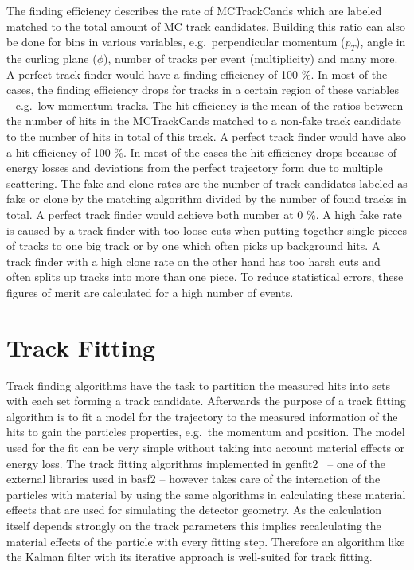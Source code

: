 The finding efficiency describes the rate of MCTrackCands which are labeled matched to the total amount of MC track candidates. Building this ratio can also be done for bins in various variables, e.g.\ perpendicular momentum ($p_T$), angle in the curling plane ($\phi$), number of tracks per event (multiplicity) and many more. A perfect track finder would have a finding efficiency of 100 \%. In most of the cases, the finding efficiency drops for tracks in a certain region of these variables -- e.g.\ low momentum tracks.
The hit efficiency is the mean of the ratios between the number of hits in the MCTrackCands matched to a non-fake track candidate to the number of hits in total of this track. A perfect track finder would have also a hit efficiency of 100 \%. In most of the cases the hit efficiency drops because of energy losses and deviations from the perfect trajectory form due to multiple scattering.
The fake and clone rates are the number of track candidates labeled as fake or clone by the matching algorithm divided by the number of found tracks in total. A perfect track finder would achieve both number at 0 \%. A high fake rate is caused by a track finder with too loose cuts when putting together single pieces of tracks to one big track or by one which often picks up background hits. A track finder with a high clone rate on the other hand has too harsh cuts and often splits up tracks into more than one piece. To reduce statistical errors, these figures of merit are calculated for a high number of events.

\section{Track Fitting} \label{section-fitting}

Track finding algorithms have the task to partition the measured hits into sets with each set forming a track candidate. Afterwards the purpose of a track fitting algorithm is to fit a model for the trajectory to the measured information of the hits to gain the particles properties, e.g.\ the momentum and position. The model used for the fit can be very simple without taking into account material effects or energy loss. The track fitting algorithms implemented in genfit2~\cite{genfit} -- one of the external libraries used in basf2 -- however takes care of the interaction of the particles with material by using the same algorithms in calculating these material effects that are used for simulating the detector geometry. As the calculation itself depends strongly on the track parameters this implies recalculating the material effects of the particle with every fitting step. Therefore an algorithm like the Kalman filter with its iterative approach is well-suited for track fitting.

